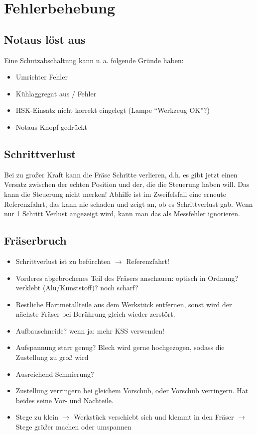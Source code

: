 \documentclass{\basedir/fablab-document}
\begin{document}
\section{Fehlerbehebung}

\subsection{Notaus löst aus}
Eine Schutzabschaltung kann u.\,a. folgende Gründe haben:
\begin{itemize}
	\item Umrichter Fehler
	\item Kühlaggregat aus / Fehler
	\item HSK-Einsatz nicht korrekt eingelegt (Lampe \enquote{Werkzeug OK}?)
	\item Notaus-Knopf gedrückt
\end{itemize}


\subsection{Schrittverlust}
Bei zu großer Kraft kann die Fräse Schritte verlieren, d.h. es gibt jetzt einen Versatz zwischen der echten Position und der, die die Steuerung haben will. Das kann die Steuerung nicht merken! Abhilfe ist im Zweifelsfall eine erneute Referenzfahrt, das kann nie schaden und zeigt an, ob es Schrittverlust gab. Wenn nur 1 Schritt Verlust angezeigt wird, kann man das als Messfehler ignorieren.

\subsection{Fräserbruch}
\begin{itemize}
 \item Schrittverlust ist zu befürchten $\rightarrow$ Referenzfahrt!
 \item Vorderes abgebrochenes Teil des Fräsers anschauen: optisch in Ordnung? verklebt (Alu/Kunststoff)? noch scharf?
 \item Restliche Hartmetallteile aus dem Werkstück entfernen, sonst wird der nächste Fräser bei Berührung gleich wieder zerstört.
 \item Aufbauschneide? wenn ja: mehr KSS verwenden!
 \item Aufspannung starr genug? Blech wird gerne hochgezogen, sodass die Zustellung zu groß wird
 \item Ausreichend Schmierung?
 \item Zustellung verringern bei gleichem Vorschub, oder Vorschub verringern. Hat beides seine Vor- und Nachteile.
 \item Stege zu klein $\rightarrow$ Werkstück verschiebt sich und klemmt in den Fräser $\rightarrow$ Stege größer machen oder umspannen
 \end{itemize}
\end{document}

